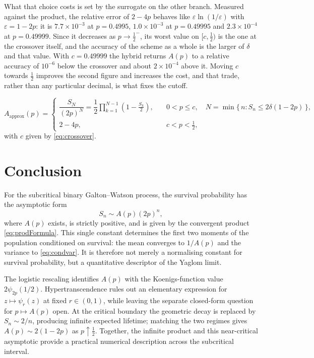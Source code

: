What that choice costs is set by the surrogate on the other branch. Measured
against the product, the relative error of $2-4p$ behaves like
$\varepsilon\ln(1/\varepsilon)$ with $\varepsilon=1-2p$: it is $7.7\times10^{-3}$ at
$p=0.4995$, $1.0\times10^{-3}$ at $p=0.49995$ and $2.3\times10^{-4}$ at
$p=0.49999$. Since it decreases as $p\to\tfrac12^-$, its worst value on
$[c,\tfrac12)$ is the one at the crossover itself, and the accuracy of the scheme
as a whole is the larger of $\delta$ and that value. With $c=0.49999$ the hybrid
returns $A(p)$ to a relative accuracy of $10^{-6}$ below the crossover and about
$2\times10^{-4}$ above it. Moving $c$ towards $\tfrac12$ improves the second figure
and increases the cost, and that trade, rather than any particular decimal, is what
fixes the cutoff.

\begin{equation}
    A_{\mathrm{approx}}(p) =
\begin{cases}
\dfrac{S_N}{(2p)^N}=\dfrac{1}{2}\displaystyle\prod_{k=1}^{N-1}\left(1-\frac{S_k}{2}\right),
\quad &0<p\le c,\quad N=\min\{\,n:S_n\le2\delta(1-2p)\,\},\\[4mm]
2-4p, \quad& c<p<\tfrac12 ,
\end{cases}
\label{eq:hybrid}
\end{equation}
with $c$ given by \eqref{eq:crossover}.





\section{Conclusion}

For the subcritical binary Galton--Watson process, the survival probability has the
asymptotic form
\[
S_n\sim A(p)(2p)^n,
\]
where $A(p)$ exists, is strictly positive, and is given by the convergent product
\eqref{eq:prodFormula}. This single constant determines the first two moments of
the population conditioned on survival: the mean converges to $1/A(p)$ and the
variance to \eqref{eq:condvar}. It is therefore not merely a normalising constant
for survival probability, but a quantitative descriptor of the Yaglom limit.

The logistic rescaling identifies $A(p)$ with the Koenigs-function value
$2\psi_{2p}(1/2)$. Hypertranscendence rules out an elementary expression for
$z\mapsto\psi_r(z)$ at fixed $r\in(0,1)$, while leaving the separate closed-form
question for $p\mapsto A(p)$ open. At the critical boundary the geometric decay is
replaced by $S_n\sim2/n$, producing infinite expected lifetime; matching the two
regimes gives $A(p)\sim2(1-2p)$ as $p\uparrow\tfrac12$. Together, the infinite
product and this near-critical asymptotic provide a practical numerical description
across the subcritical interval.


